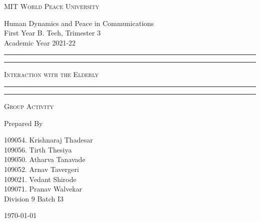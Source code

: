 \documentclass[11pt]{article}
\begin{document}
	
	\begin{titlepage} 
		\centering 
		
		
		\huge\textsc{
			MIT World Peace University
		}\\
	
		\vspace{0.75\baselineskip} %
		
		\LARGE{
			Human Dynamics and Peace in Communications\\
			First Year B. Tech, Trimester 3\\
			Academic Year 2021-22
		}
		
		\vfill %
		
		
		\rule{\textwidth}{1.6pt}\vspace*{-\baselineskip}\vspace*{2pt}
		\rule{\textwidth}{0.6pt}
		\vspace{0.75\baselineskip} %
		
		
		
		\huge{\textsc{
				Interaction with the Elderly
			}} \\
		
		
		
		\vspace{0.5\baselineskip} %
		\rule{\textwidth}{0.6pt}\vspace*{-\baselineskip}\vspace*{2.8pt}
		\rule{\textwidth}{1.6pt}
		
		\vspace{1\baselineskip} %

			
		\LARGE\textsc{
			Group Activity
		} %
		\vfill
		
		
		Prepared By
		\vspace{0.5\baselineskip} %
		
		\Large{
			109054. Krishnaraj Thadesar\\
			109056. Tirth Thesiya\\
			109050. Atharva Tanavade\\
			109052. Arnav Tavergeri\\
			109021. Vedant Shirode\\
			109071. Pranav Walvekar\\
			\vspace{1cm}
			Division 9 Batch I3
		}
		
		
		\vspace{0.5\baselineskip} %
		\today

	\end{titlepage}
\end{document}
